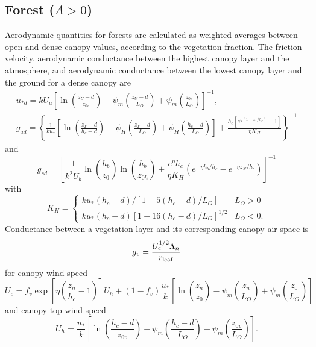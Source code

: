 \documentclass[fleqn]{article}
\begin{document}
\subsection{Forest ($\Lambda > 0$)}

Aerodynamic quantities for forests are calculated as weighted averages between open and dense-canopy values, according to the vegetation fraction. The friction velocity, aerodynamic conductance between the highest canopy layer and the atmosphere, and aerodynamic conductance between the lowest canopy layer and the ground for a dense canopy are
\begin{gather}
u_{*d} = kU_a\left[\ln\left(\frac{z_U-d}{z_{0v}}\right) - \psi_m\left(\frac{z_U-d}{L_O}\right) + \psi_m\left(\frac{z_{0v}}{L_O}\right)\right]^{-1}, \\
g_{ad} = \left\{\frac{1}{ku_*}\left[\ln\left(\frac{z_T-d}{h_c-d}\right) 
      - \psi_H\left(\frac{z_T-d}{L_O}\right) + \psi_H\left(\frac{h_c-d}{L_O}\right)\right]
      + \frac{h_c\left[e^{\eta(1-z_1/h_c)}-1\right]}{\eta K_H}\right\}^{-1}
\end{gather}
and
\begin{equation}
g_{sd} = \left[\frac{1}{k^2U_b}\ln\left(\frac{h_b}{z_0}\right)\ln\left(\frac{h_b}{z_{0h}}\right) +
       \frac{e^\eta h_c}{\eta K_H}\left(e^{-\eta h_b/h_c} - e^{-\eta z_N/h_c}\right)\right]^{-1}
\end{equation}
with
\begin{equation}
K_H = 
\begin{cases}
    ku_*(h_c-d)/[1 + 5(h_c -d)/L_O]        & L_O > 0 \\
    ku_*(h_c-d)[1 - 16(h_c - d)/L_O]^{1/2} &  L_O < 0.
\end{cases}
\end{equation}
Conductance between a vegetation layer and its corresponding canopy air space is 
\begin{equation}
g_v = \frac{U_c^{1/2}\Lambda_n}{r_{\rm leaf}}
\end{equation}
for canopy wind speed
\begin{equation}
U_c = f_v\exp\left[\eta\left(\frac{z_n}{h_c} - 1\right)\right]U_h  + 
      (1 - f_v)\frac{u_*}{k}\left[\ln\left(\frac{z_n}{z_0}\right) - \psi_m\left(\frac{z_n}{L_O}\right) + \psi_m\left(\frac{z_0}{L_O}\right)\right]
\end{equation}
and canopy-top wind speed
\begin{equation}
U_h = \frac{u_*}{k}\left[\ln\left(\frac{h_c-d}{z_{0v}}\right) - \psi_m\left(\frac{h_c-d}{L_O}\right) + \psi_m\left(\frac{z_{0v}}{L_O}\right)\right].
\end{equation}
\end{document}
